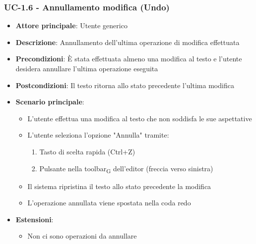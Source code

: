 \documentclass[11pt,a4paper]{article}
\newcommand{\gls}[1]{#1\textsubscript{G}}
\begin{document}
\subsubsection{UC-1.6 - Annullamento modifica (Undo)}
\begin{itemize}
    \item \textbf{Attore principale}: Utente generico
    \item \textbf{Descrizione}: Annullamento dell'ultima operazione di modifica effettuata
    \item \textbf{Precondizioni}: È stata effettuata almeno una modifica al testo e l'utente desidera annullare l'ultima operazione eseguita
    \item \textbf{Postcondizioni}: Il testo ritorna allo stato precedente l'ultima modifica
    \item \textbf{Scenario principale}:
        \begin{itemize}
            \item L'utente effettua una modifica al testo che non soddisfa le sue aspettative
            \item L'utente seleziona l'opzione "Annulla" tramite:
                \begin{enumerate}
                    \item Tasto di scelta rapida (Ctrl+Z)
                    \item Pulsante nella \gls{toolbar} dell'editor (freccia verso sinistra)
                \end{enumerate}
            \item Il sistema ripristina il testo allo stato precedente la modifica
            \item L'operazione annullata viene spostata nella coda redo
        \end{itemize}
    \item \textbf{Estensioni}:
        \begin{itemize}
            \item Non ci sono operazioni da annullare
        \end{itemize}
\end{itemize}
\end{document}
